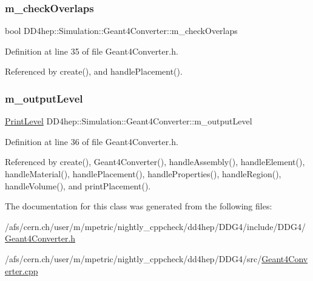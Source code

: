 \subsubsection{\texorpdfstring{m\+\_\+check\+Overlaps}{m\_checkOverlaps}}
{\footnotesize\ttfamily bool D\+D4hep\+::\+Simulation\+::\+Geant4\+Converter\+::m\+\_\+check\+Overlaps}



Definition at line 35 of file Geant4\+Converter.\+h.



Referenced by create(), and handle\+Placement().

\hypertarget{class_d_d4hep_1_1_simulation_1_1_geant4_converter_a0beb45875a3be411994a235aa545dbbc}{}\label{class_d_d4hep_1_1_simulation_1_1_geant4_converter_a0beb45875a3be411994a235aa545dbbc} 
\subsubsection{\texorpdfstring{m\+\_\+output\+Level}{m\_outputLevel}}
{\footnotesize\ttfamily \hyperlink{namespace_d_d4hep_a5b5a64d56252469451f2020a27d57d42}{Print\+Level} D\+D4hep\+::\+Simulation\+::\+Geant4\+Converter\+::m\+\_\+output\+Level}



Definition at line 36 of file Geant4\+Converter.\+h.



Referenced by create(), Geant4\+Converter(), handle\+Assembly(), handle\+Element(), handle\+Material(), handle\+Placement(), handle\+Properties(), handle\+Region(), handle\+Volume(), and print\+Placement().



The documentation for this class was generated from the following files\+:\begin{DoxyCompactItemize}
\item 
/afs/cern.\+ch/user/m/mpetric/nightly\+\_\+cppcheck/dd4hep/\+D\+D\+G4/include/\+D\+D\+G4/\hyperlink{_geant4_converter_8h}{Geant4\+Converter.\+h}\item 
/afs/cern.\+ch/user/m/mpetric/nightly\+\_\+cppcheck/dd4hep/\+D\+D\+G4/src/\hyperlink{_geant4_converter_8cpp}{Geant4\+Converter.\+cpp}\end{DoxyCompactItemize}
